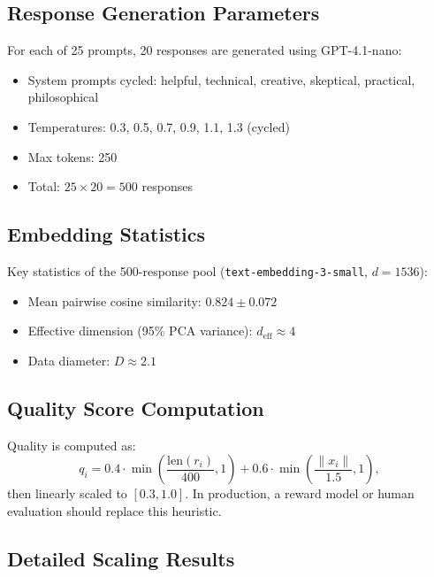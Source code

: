 \documentclass[10pt]{article}
\begin{document}
\subsection{Response Generation Parameters}

For each of 25 prompts, 20 responses are generated using GPT-4.1-nano:
\begin{itemize}[leftmargin=*,itemsep=1pt]
\item System prompts cycled: helpful, technical, creative, skeptical, practical, philosophical
\item Temperatures: 0.3, 0.5, 0.7, 0.9, 1.1, 1.3 (cycled)
\item Max tokens: 250
\item Total: $25 \times 20 = 500$ responses
\end{itemize}

\subsection{Embedding Statistics}

Key statistics of the 500-response pool (\texttt{text-embedding-3-small}, $d=1536$):
\begin{itemize}[leftmargin=*,itemsep=1pt]
\item Mean pairwise cosine similarity: $0.824 \pm 0.072$
\item Effective dimension (95\% PCA variance): $d_{\mathrm{eff}} \approx 4$
\item Data diameter: $D \approx 2.1$
\end{itemize}

\subsection{Quality Score Computation}

Quality is computed as:
\begin{equation}
q_i = 0.4 \cdot \min\!\left(\frac{\mathrm{len}(r_i)}{400}, 1\right) + 0.6 \cdot \min\!\left(\frac{\|x_i\|}{1.5}, 1\right),
\end{equation}
then linearly scaled to $[0.3, 1.0]$.
In production, a reward model or human evaluation should replace this heuristic.

\subsection{Detailed Scaling Results}
\end{document}
